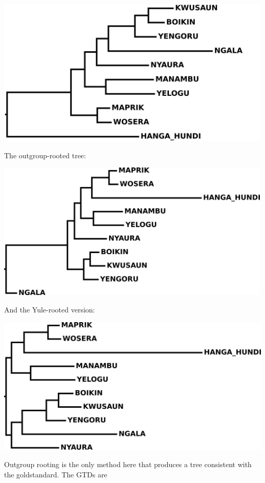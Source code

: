 \documentclass[
  a4paper,
  14pt,
  oneside,
  tablecaptionabove
]{scrbook}
\begin{document}
{\includegraphics[width=5.21875in,height=2.78125in]{images/Ndu.madRooted.jpg}}

{The outgroup-rooted tree:}

{\includegraphics[width=5.20833in,height=2.59375in]{images/Ndu.outgroupRooted.jpg}}

{And the Yule-rooted version:}

{\includegraphics[width=5.22917in,height=2.60417in]{images/Ndu.yuleRooted.jpg}}

{Outgroup rooting is the only method here that produces a tree
consistent with the goldstandard. The GTDs are}
\end{document}
